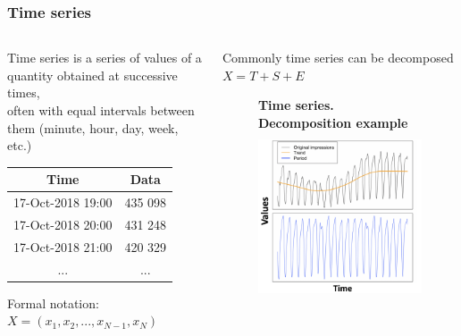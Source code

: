 \documentclass[intlimits, 9pt, unicode]{beamer}
\begin{document}
\begin{frame}
    \frametitle{Time series}
	
    {\begin{columns}
        \begin{column}{5.5cm}
 Time series is a series of values of a quantity obtained at successive times,\\ often with equal intervals between them (minute, hour, day, week, etc.)

\vspace{0.3cm}
\begin{table}[h!]
\centering
 \begin{tabular}{||c c||}
 \hline
 Time & Data \\ [0.5ex]
 \hline\hline
 17-Oct-2018 19:00 & 435 098 \\
 \hline
 17-Oct-2018 20:00 & 431 248  \\
 \hline
 17-Oct-2018 21:00 & 420 329  \\
 \hline
 ... & ... \\ [1ex]
 \hline
\end{tabular}
\end{table}

	
\vspace{0.3cm} Formal notation:
 $ X = (x_1, x_2, ... , x_{N-1} , x_N)  $

        \end{column}

\hspace{-0.5cm}
        \begin{column}{5cm}
Commonly time series can be decomposed $X = T + S + E$
        \begin{figure}
        \centering
	\textbf{Time series. Decomposition example}
        \includegraphics[height=5cm]{images/impressions_stl_6}
	\end{figure}
	
        \end{column}
    \end{columns}}
\end{frame}
\end{document}
